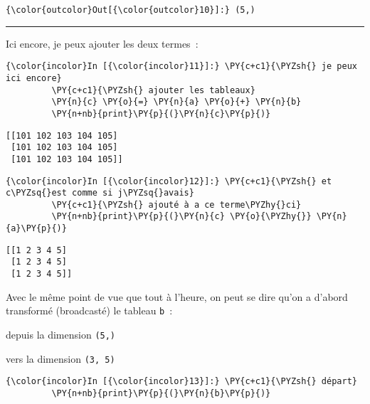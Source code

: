 \begin{Verbatim}[commandchars=\\\{\}]
{\color{outcolor}Out[{\color{outcolor}10}]:} (5,)
\end{Verbatim}
            
    \begin{center}\rule{0.5\linewidth}{\linethickness}\end{center}

    Ici encore, je peux ajouter les deux termes~:

    \begin{Verbatim}[commandchars=\\\{\}]
{\color{incolor}In [{\color{incolor}11}]:} \PY{c+c1}{\PYZsh{} je peux ici encore}
         \PY{c+c1}{\PYZsh{} ajouter les tableaux}
         \PY{n}{c} \PY{o}{=} \PY{n}{a} \PY{o}{+} \PY{n}{b}
         \PY{n+nb}{print}\PY{p}{(}\PY{n}{c}\PY{p}{)}
\end{Verbatim}


    \begin{Verbatim}[commandchars=\\\{\}]
[[101 102 103 104 105]
 [101 102 103 104 105]
 [101 102 103 104 105]]

    \end{Verbatim}

    \begin{Verbatim}[commandchars=\\\{\}]
{\color{incolor}In [{\color{incolor}12}]:} \PY{c+c1}{\PYZsh{} et c\PYZsq{}est comme si j\PYZsq{}avais}
         \PY{c+c1}{\PYZsh{} ajouté à a ce terme\PYZhy{}ci}
         \PY{n+nb}{print}\PY{p}{(}\PY{n}{c} \PY{o}{\PYZhy{}} \PY{n}{a}\PY{p}{)}
\end{Verbatim}


    \begin{Verbatim}[commandchars=\\\{\}]
[[1 2 3 4 5]
 [1 2 3 4 5]
 [1 2 3 4 5]]

    \end{Verbatim}

    Avec le même point de vue que tout à l'heure, on peut se dire qu'on a
d'abord transformé (broadcasté) le tableau \texttt{b}~:

    depuis la dimension \texttt{(5,)}

    vers la dimension \texttt{(3,\ 5)}

    \begin{Verbatim}[commandchars=\\\{\}]
{\color{incolor}In [{\color{incolor}13}]:} \PY{c+c1}{\PYZsh{} départ}
         \PY{n+nb}{print}\PY{p}{(}\PY{n}{b}\PY{p}{)}
\end{Verbatim}


